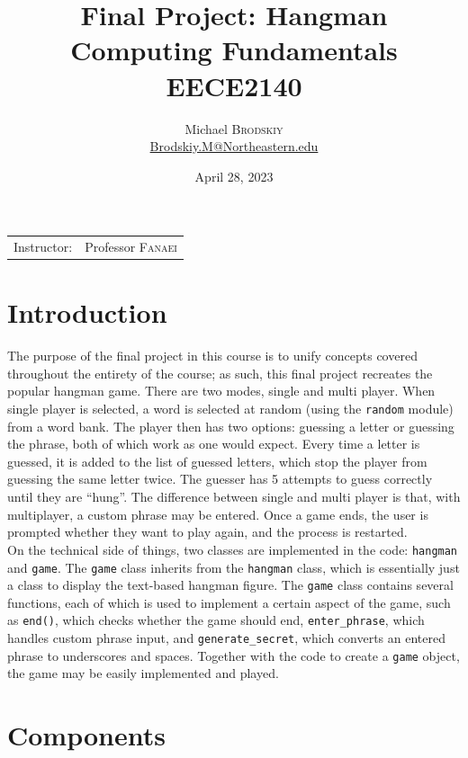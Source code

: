 \documentclass[
	letterpaper, %
	10pt, %
]{CSUniSchoolLabReport}
\title{Final Project: Hangman\\ Computing Fundamentals\\ EECE2140} %
\author{Michael \textsc{Brodskiy}\\ \small \href{mailto:Brodskiy.M@Northeastern.edu}{Brodskiy.M@Northeastern.edu}}
\date{April 28, 2023} %
\begin{document}
\maketitle %

\begin{center}
	\begin{tabular}{l r}
		Instructor: & Professor \textsc{Fanaei} %
	\end{tabular}
\end{center}

\newpage

\section{Introduction}

The purpose of the final project in this course is to unify concepts covered throughout the entirety of the course; as such, this final project recreates the popular hangman game. There are two modes, single and multi player. When single player is selected, a word is selected at random (using the \texttt{random} module) from a word bank. The player then has two options: guessing a letter or guessing the phrase, both of which work as one would expect. Every time a letter is guessed, it is added to the list of guessed letters, which stop the player from guessing the same letter twice. The guesser has 5 attempts to guess correctly until they are ``hung''. The difference between single and multi player is that, with multiplayer, a custom phrase may be entered. Once a game ends, the user is prompted whether they want to play again, and the process is restarted.\\

On the technical side of things, two classes are implemented in the code: \texttt{hangman} and \texttt{game}. The \texttt{game} class inherits from the \texttt{hangman} class, which is essentially just a class to display the text-based hangman figure. The \texttt{game} class contains several functions, each of which is used to implement a certain aspect of the game, such as \texttt{end()}, which checks whether the game should end, \texttt{enter\_phrase}, which handles custom phrase input, and \texttt{generate\_secret}, which converts an entered phrase to underscores and spaces. Together with the code to create a \texttt{game} object, the game may be easily implemented and played.

\section{Components}
\end{document}
